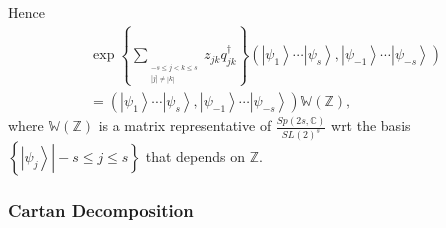 \documentclass[aps,preprint]{revtex4}%
\begin{document}
Hence%
\begin{align}
&  \exp\left\{  \sum\limits_{_{\substack{-s\leq j<k\leq s\\\left\vert
j\right\vert \neq\left\vert k\right\vert }}}z_{jk}q_{jk}^{\dagger}\right\}
\left(  \left\vert \psi_{1}\right\rangle \cdots\left\vert \psi_{s}%
\right\rangle ,\left\vert \psi_{-1}\right\rangle \cdots\left\vert \psi
_{-s}\right\rangle \right) \\
&  =\left(  \left\vert \psi_{1}\right\rangle \cdots\left\vert \psi
_{s}\right\rangle ,\left\vert \psi_{-1}\right\rangle \cdots\left\vert
\psi_{-s}\right\rangle \right)  \mathbb{W}\left(  \mathbb{Z}\right)  ,
\end{align}
where $\mathbb{W}\left(  \mathbb{Z}\right)  $ is a matrix representative of
$\frac{Sp\left(  2s,\mathbb{C}\right)  }{SL\left(  2\right)  ^{s}}$ wrt the
basis $\left\{  \left.  \left\vert \psi_{j}\right\rangle \right\vert -s\leq
j\leq s\right\}  $ that depends on $\mathbb{Z}.$

\subsubsection{Cartan Decomposition}
\end{document}

